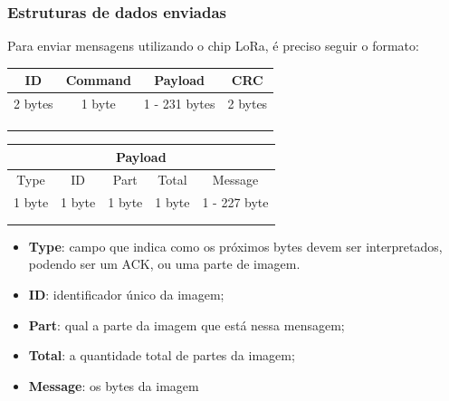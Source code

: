 \documentclass[12pt]{beamer}
\begin{document}
\begin{frame}[allowframebreaks]
    \centering
    \frametitle{Estruturas de dados enviadas}
    Para enviar mensagens utilizando o chip LoRa, é preciso seguir o formato:
    \begin{table}[t]
        \begin{tabular}{llll}
            \hline
            \multicolumn{1}{|c|}{ID}      & \multicolumn{1}{c|}{Command} & \multicolumn{1}{c|}{Payload}       & \multicolumn{1}{c|}{CRC}     \\ \hline
            \multicolumn{1}{|c|}{2 bytes} & \multicolumn{1}{c|}{1 byte}  & \multicolumn{1}{c|}{1 - 231 bytes} & \multicolumn{1}{c|}{2 bytes} \\ \hline
                                          &  &  &  \\
                                          &  &  &  \\
                                          &  &  &
        \end{tabular}
    \end{table}

    \framebreak

    \begin{table}[h]
        \centering
        \begin{tabular}{cllll}
            \hline
            \multicolumn{5}{|c|}{Payload}    \\ \hline
            \multicolumn{1}{|c|}{Type}   & \multicolumn{1}{c|}{ID}     & \multicolumn{1}{c|}{Part}   & \multicolumn{1}{c|}{Total}  & \multicolumn{1}{c|}{Message}      \\ \hline
            \multicolumn{1}{|c|}{1 byte} & \multicolumn{1}{c|}{1 byte} & \multicolumn{1}{c|}{1 byte} & \multicolumn{1}{c|}{1 byte} & \multicolumn{1}{c|}{1 - 227 byte} \\ \hline
            \multicolumn{1}{l}{} &  &  &  &  \\
            \multicolumn{1}{l}{} &  &  &  &
        \end{tabular}
    \end{table}

    \begin{itemize}
        \item\textbf{Type}: campo que indica como os próximos bytes devem ser interpretados, podendo ser um ACK, ou uma parte de imagem.
        \item\textbf{ID}: identificador único da imagem;
        \item\textbf{Part}: qual a parte da imagem que está nessa mensagem;
        \item\textbf{Total}: a quantidade total de partes da imagem;
        \item\textbf{Message}: os bytes da imagem
    \end{itemize}
\end{frame}
\end{document}
